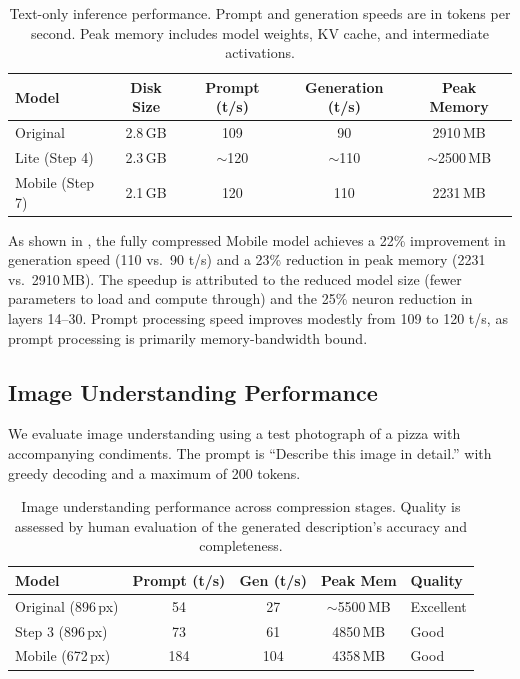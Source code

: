 \documentclass[11pt]{article}
\begin{document}
\begin{table}[t]
\centering
\caption{Text-only inference performance. Prompt and generation speeds are in tokens per second. Peak memory includes model weights, KV cache, and intermediate activations.}
\label{tab:text_results}
\begin{tabular}{@{}lcccc@{}}
\toprule
Model & Disk Size & Prompt (t/s) & Generation (t/s) & Peak Memory \\
\midrule
Original & 2.8\,GB & 109 & 90 & 2910\,MB \\
Lite (Step 4) & 2.3\,GB & $\sim$120 & $\sim$110 & $\sim$2500\,MB \\
Mobile (Step 7) & 2.1\,GB & 120 & 110 & 2231\,MB \\
\bottomrule
\end{tabular}
\end{table}

As shown in , the fully compressed Mobile model achieves a 22\% improvement in generation speed (110 vs.\ 90 t/s) and a 23\% reduction in peak memory (2231 vs.\ 2910\,MB). The speedup is attributed to the reduced model size (fewer parameters to load and compute through) and the 25\% neuron reduction in layers 14--30. Prompt processing speed improves modestly from 109 to 120 t/s, as prompt processing is primarily memory-bandwidth bound.

\subsection{Image Understanding Performance}

We evaluate image understanding using a test photograph of a pizza with accompanying condiments. The prompt is ``Describe this image in detail.'' with greedy decoding and a maximum of 200 tokens.

\begin{table}[t]
\centering
\caption{Image understanding performance across compression stages. Quality is assessed by human evaluation of the generated description's accuracy and completeness.}
\label{tab:image_results}
\begin{tabular}{@{}lcccl@{}}
\toprule
Model & Prompt (t/s) & Gen (t/s) & Peak Mem & Quality \\
\midrule
Original (896\,px) & 54 & 27 & $\sim$5500\,MB & Excellent \\
Step 3 (896\,px) & 73 & 61 & 4850\,MB & Good \\
Mobile (672\,px) & 184 & 104 & 4358\,MB & Good \\
\bottomrule
\end{tabular}
\end{table}
\end{document}
